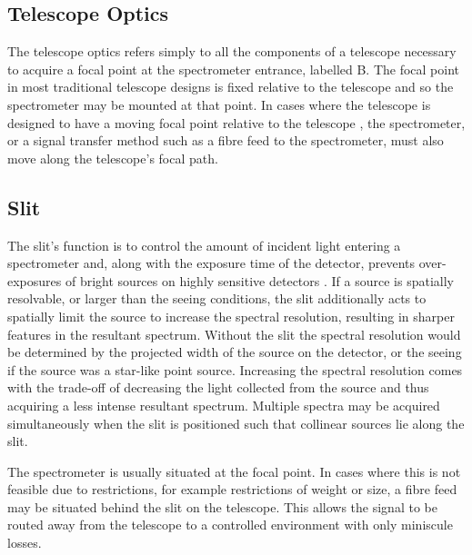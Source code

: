 \subsection{Telescope Optics}

The telescope optics refers simply to all the components of a telescope necessary to acquire a focal point at the spectrometer entrance, labelled B.
The focal point in most traditional telescope designs is fixed relative to the telescope and so the spectrometer may be mounted at that point.
In cases where the telescope is designed to have a moving focal point relative to the telescope \cite[see][]{Arecibo, HET, SALT_design}, the spectrometer, or a signal transfer method such as a fibre feed to the spectrometer, must also move along the telescope's focal path.

\subsection{Slit}

The slit's function is to control the amount of incident light entering a spectrometer and, along with the exposure time of the detector, prevents over-exposures of bright sources on highly sensitive detectors \citep{TonkPracAmSpec}.
If a source is spatially resolvable, or larger than the seeing conditions, the slit additionally acts to spatially limit the source to increase the spectral resolution, resulting in sharper features in the resultant spectrum.
Without the slit the spectral resolution would be determined by the projected width of the source on the detector, or the seeing if the source was a star-like point source.
Increasing the spectral resolution comes with the trade-off of decreasing the light collected from the source and thus acquiring a less intense resultant spectrum.
Multiple spectra may be acquired simultaneously when the slit is positioned such that collinear sources lie along the slit.

The spectrometer is usually situated at the focal point.
In cases where this is not feasible due to restrictions, for example restrictions of weight or size, a fibre feed may be situated behind the slit on the telescope.
This allows the signal to be routed away from the telescope to a controlled environment with only miniscule losses.


